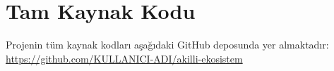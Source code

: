 \documentclass[12pt, a4paper]{article}
\begin{document}
\appendix
\section{Tam Kaynak Kodu}

Projenin tüm kaynak kodları aşağıdaki GitHub deposunda yer almaktadır:\\
\url{https://github.com/KULLANICI-ADI/akilli-ekosistem}

% 
\end{document}
